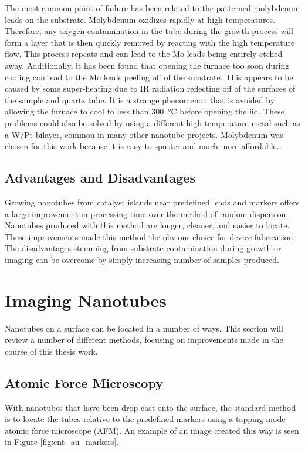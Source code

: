 The most common point of failure has been related to the patterned molybdenum leads on the substrate. Molybdenum oxidizes rapidly at high temperatures. Therefore, any oxygen contamination in the tube during the growth process will form a  layer that is then quickly removed by reacting with the high temperature  flow. This process repeats and can lead to the Mo leads being entirely etched away. Additionally, it has been found that opening the furnace too soon during cooling can lead to the Mo leads peeling off of the substrate. This appears to be caused by some super-heating due to IR radiation reflecting off of the surfaces of the sample and quartz tube. It is a strange phenomenon that is avoided by allowing the furnace to cool to less than \SI{300}{\degreeCelsius} before opening the lid. These problems could also be solved by using a different high temperature metal such as a W/Pt bilayer, common in many other nanotube projects. Molybdenum was chosen for this work because it is easy to sputter and much more affordable.

\subsection{Advantages and Disadvantages}

Growing nanotubes from catalyst islands near predefined leads and markers offers a large improvement in processing time over the method of random dispersion. Nanotubes produced with this method are longer, cleaner, and easier to locate. These improvements made this method the obvious choice for device fabrication. The disadvantages stemming from substrate contamination during growth or imaging can be overcome by simply increasing number of samples produced.

\section{Imaging Nanotubes}
\label{subsubsec:imaging_disperse}

Nanotubes on a  surface can be located in a number of ways. This section will review a number of different methods, focusing on improvements made in the course of this thesis work.

\subsection{Atomic Force Microscopy}

With nanotubes that have been drop cast onto the surface, the standard method is to locate the tubes relative to the predefined markers using a tapping mode atomic force microscope (AFM). An example of an image created this way is seen in Figure \ref{fig:cnt_au_markers}. 

